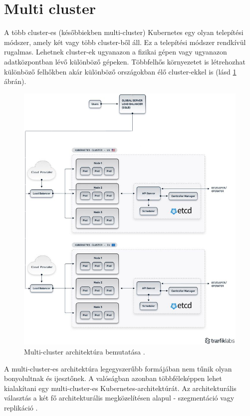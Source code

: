 \newpage

\section{Multi cluster}
A több cluster-es (későbbiekben multi-cluster) Kubernetes egy olyan telepítési módszer, amely két vagy több cluster-ből áll.
Ez a telepítési módszer rendkívül rugalmas. Lehetnek cluster-ek ugyanazon a fizikai gépen vagy ugyanazon adatközpontban lévő különböző gépeken.
Többfelhős környezetet is létrehozhat különböző felhőkben akár különböző országokban élő cluster-ekkel is (lásd \ref{multi-cluster} ábrán).

\begin{figure}[ht]
    \centering
         \includegraphics[width=1.0\textwidth]{figures/istio/multicluster-mod.png}
          \caption{Multi-cluster architektúra bemutatása \cite{multicluster}.}
           \label{multi-cluster}
\end{figure}

A multi-cluster-es architektúra legegyszerűbb formájában nem tűnik olyan bonyolultnak és ijesztőnek.
A valóságban azonban többféleképpen lehet kialakítani egy multi-cluster-es Kubernetes-architektúrát.
Az architekturális választás a két fő architekturális megközelítésen alapul - szegmentáció vagy replikáció \cite{multicluster}.

